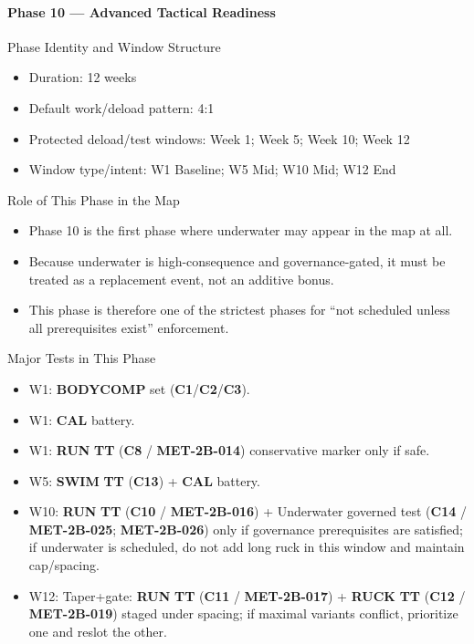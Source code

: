 \documentclass[10pt]{article}
\begin{document}
\newpage
\paragraph*{Phase 10 — Advanced Tactical Readiness}

Phase Identity and Window Structure

\begin{itemize}
\item Duration: 12 weeks
\item Default work/deload pattern: 4:1
\item Protected deload/test windows: Week 1; Week 5; Week 10; Week 12
\item Window type/intent: W1 Baseline; W5 Mid; W10 Mid; W12 End
\end{itemize}

Role of This Phase in the Map

\begin{itemize}
\item Phase 10 is the first phase where underwater may appear in the map at all.
\item Because underwater is high-consequence and governance-gated, it must be treated as a replacement event, not an additive bonus.
\item This phase is therefore one of the strictest phases for “not scheduled unless all prerequisites exist” enforcement.
\end{itemize}

Major Tests in This Phase

\begin{itemize}
\item W1: \textbf{BODYCOMP} set (\textbf{C1}/\textbf{C2}/\textbf{C3}).
\item W1: \textbf{CAL} battery.
\item W1: \textbf{RUN} \textbf{TT} (\textbf{C8} / \textbf{MET-2B-014}) conservative marker only if safe.
\item W5: \textbf{SWIM} \textbf{TT} (\textbf{C13}) + \textbf{CAL} battery.
\item W10: \textbf{RUN} \textbf{TT} (\textbf{C10} / \textbf{MET-2B-016}) + Underwater governed test (\textbf{C14} / \textbf{MET-2B-025}; \textbf{MET-2B-026}) only if governance prerequisites are satisfied; if underwater is scheduled, do not add long ruck in this window and maintain cap/spacing.
\item W12: Taper+gate: \textbf{RUN} \textbf{TT} (\textbf{C11} / \textbf{MET-2B-017}) + \textbf{RUCK} \textbf{TT} (\textbf{C12} / \textbf{MET-2B-019}) staged under spacing; if maximal variants conflict, prioritize one and reslot the other.
\end{itemize}
\end{document}
